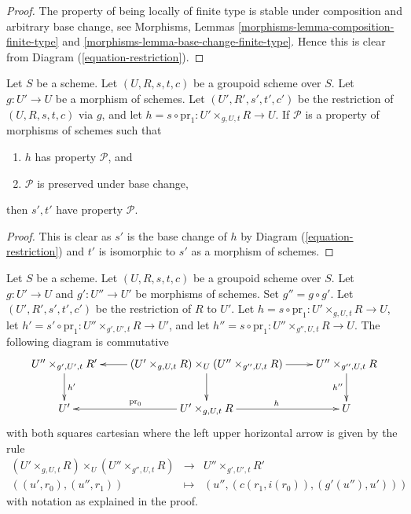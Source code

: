 \begin{proof}
The property of being locally of finite type is stable under composition
and arbitrary base change, see
Morphisms, Lemmas \ref{morphisms-lemma-composition-finite-type} and
\ref{morphisms-lemma-base-change-finite-type}.
Hence this is clear from Diagram (\ref{equation-restriction}).
\end{proof}

\begin{lemma}
\label{lemma-restrict-property}
Let $S$ be a scheme.
Let $(U, R, s, t, c)$ be a groupoid scheme over $S$.
Let $g : U' \to U$ be a morphism of schemes.
Let $(U', R', s', t', c')$ be the restriction of
$(U, R, s, t, c)$ via $g$, and let
$h = s \circ \text{pr}_1 : U' \times_{g, U, t} R \to U$. If
$\mathcal{P}$ is a property of morphisms of schemes such that
\begin{enumerate}
\item $h$ has property $\mathcal{P}$, and
\item $\mathcal{P}$ is preserved under base change,
\end{enumerate}
then $s', t'$ have property $\mathcal{P}$.
\end{lemma}

\begin{proof}
This is clear as $s'$ is the base change of $h$ by
Diagram (\ref{equation-restriction})
and $t'$ is isomorphic to $s'$ as a morphism of schemes.
\end{proof}

\begin{lemma}
\label{lemma-double-restrict}
Let $S$ be a scheme.
Let $(U, R, s, t, c)$ be a groupoid scheme over $S$.
Let $g : U' \to U$ and $g' : U'' \to U'$ be morphisms of schemes.
Set $g'' = g \circ g'$.
Let $(U', R', s', t', c')$ be the restriction of $R$ to $U'$.
Let $h = s \circ \text{pr}_1 : U' \times_{g, U, t} R \to U$,
let $h' = s' \circ \text{pr}_1 : U'' \times_{g', U', t} R \to U'$, and
let $h'' = s \circ \text{pr}_1 : U'' \times_{g'', U, t} R \to U$.
The following diagram is commutative
$$
\xymatrix{
U'' \times_{g', U', t} R' \ar[d]^{h'} &
(U' \times_{g, U, t} R) \times_U (U'' \times_{g'', U, t} R)
\ar[l] \ar[r] \ar[d] &
U'' \times_{g'', U, t} R \ar[d]_{h''} \\
U' &
U' \times_{g, U, t} R \ar[l]_{\text{pr}_0} \ar[r]^h &
U
}
$$
with both squares cartesian where the left upper horizontal arrow
is given by the rule
$$
\begin{matrix}
(U' \times_{g, U, t} R) \times_U (U'' \times_{g'', U, t} R) &
\longrightarrow &
U'' \times_{g', U', t} R' \\
((u', r_0), (u'', r_1)) &
\longmapsto &
(u'', (c(r_1, i(r_0)), (g'(u''), u')))
\end{matrix}
$$
with notation as explained in the proof.
\end{lemma}

